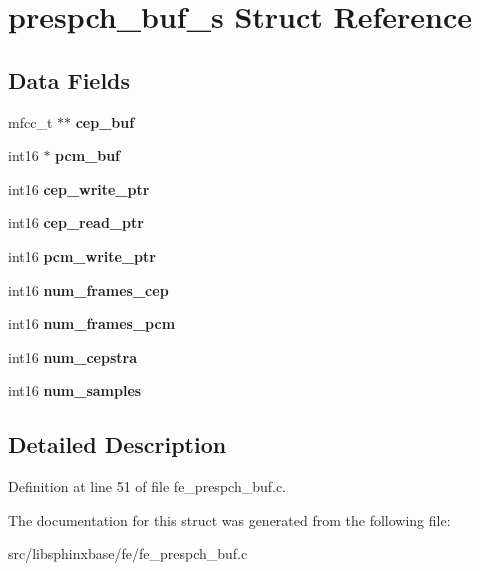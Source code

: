 \section{prespch\+\_\+buf\+\_\+s Struct Reference}
\label{structprespch__buf__s}
\subsection*{Data Fields}
\begin{DoxyCompactItemize}
\item 
mfcc\+\_\+t $\ast$$\ast$ {\bfseries cep\+\_\+buf}\label{structprespch__buf__s_a6c1208eb567b0f2a123759dfe4579256}

\item 
int16 $\ast$ {\bfseries pcm\+\_\+buf}\label{structprespch__buf__s_afc6fa1099e52f5383e4fb7f8c16e8f03}

\item 
int16 {\bfseries cep\+\_\+write\+\_\+ptr}\label{structprespch__buf__s_a339e0d13ddf808334cf0a28dd59f8e8c}

\item 
int16 {\bfseries cep\+\_\+read\+\_\+ptr}\label{structprespch__buf__s_a380d3aa29d8823a15c76055205f5d588}

\item 
int16 {\bfseries pcm\+\_\+write\+\_\+ptr}\label{structprespch__buf__s_aff9e8911f9717eed3b33eee8fab9c329}

\item 
int16 {\bfseries num\+\_\+frames\+\_\+cep}\label{structprespch__buf__s_a42b2da72f0ab5c5fa4622daa175676da}

\item 
int16 {\bfseries num\+\_\+frames\+\_\+pcm}\label{structprespch__buf__s_a3914d87504a031a083dd0c4c080b31de}

\item 
int16 {\bfseries num\+\_\+cepstra}\label{structprespch__buf__s_a8899b6abcea28de536b0abf8e6387072}

\item 
int16 {\bfseries num\+\_\+samples}\label{structprespch__buf__s_a8898e72d558042738d1ad92d2e3c7b1e}

\end{DoxyCompactItemize}


\subsection{Detailed Description}


Definition at line 51 of file fe\+\_\+prespch\+\_\+buf.\+c.



The documentation for this struct was generated from the following file\+:\begin{DoxyCompactItemize}
\item 
src/libsphinxbase/fe/fe\+\_\+prespch\+\_\+buf.\+c\end{DoxyCompactItemize}
